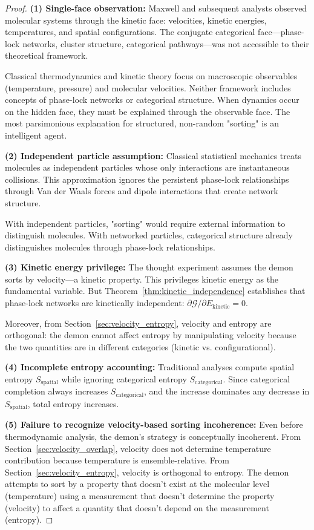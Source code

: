 \documentclass[12pt,a4paper]{article}
\theoremstyle{definition}
\theoremstyle{remark}
\newcommand{\phaselockgraph}{\mathcal{G}}
\begin{document}
\begin{proof}
\textbf{(1) Single-face observation:}
Maxwell and subsequent analysts observed molecular systems through the kinetic face: velocities, kinetic energies, temperatures, and spatial configurations. The conjugate categorical face—phase-lock networks, cluster structure, categorical pathways—was not accessible to their theoretical framework.

Classical thermodynamics and kinetic theory focus on macroscopic observables (temperature, pressure) and molecular velocities. Neither framework includes concepts of phase-lock networks or categorical structure. When dynamics occur on the hidden face, they must be explained through the observable face. The most parsimonious explanation for structured, non-random "sorting" is an intelligent agent.

\textbf{(2) Independent particle assumption:}
Classical statistical mechanics treats molecules as independent particles whose only interactions are instantaneous collisions. This approximation ignores the persistent phase-lock relationships through Van der Waals forces and dipole interactions that create network structure.

With independent particles, "sorting" would require external information to distinguish molecules. With networked particles, categorical structure already distinguishes molecules through phase-lock relationships.

\textbf{(3) Kinetic energy privilege:}
The thought experiment assumes the demon sorts by velocity—a kinetic property. This privileges kinetic energy as the fundamental variable. But Theorem~\ref{thm:kinetic_independence} establishes that phase-lock networks are kinetically independent: $\partial \phaselockgraph / \partial E_{\text{kinetic}} = 0$.

Moreover, from Section~\ref{sec:velocity_entropy}, velocity and entropy are orthogonal: the demon cannot affect entropy by manipulating velocity because the two quantities are in different categories (kinetic vs. configurational).

\textbf{(4) Incomplete entropy accounting:}
Traditional analyses compute spatial entropy $S_{\text{spatial}}$ while ignoring categorical entropy $S_{\text{categorical}}$. Since categorical completion always increases $S_{\text{categorical}}$, and the increase dominates any decrease in $S_{\text{spatial}}$, total entropy increases.

\textbf{(5) Failure to recognize velocity-based sorting incoherence:}
Even before thermodynamic analysis, the demon's strategy is conceptually incoherent. From Section~\ref{sec:velocity_overlap}, velocity does not determine temperature contribution because temperature is ensemble-relative. From Section~\ref{sec:velocity_entropy}, velocity is orthogonal to entropy. The demon attempts to sort by a property that doesn't exist at the molecular level (temperature) using a measurement that doesn't determine the property (velocity) to affect a quantity that doesn't depend on the measurement (entropy).


\end{proof}
\end{document}
